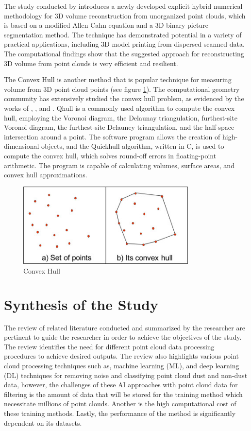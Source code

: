 The study conducted by \citet{jeong2018} introduces a newly developed explicit hybrid numerical methodology for 3D volume reconstruction from unorganized point clouds, which is based on a modified Allen-Cahn equation and a 3D binary picture segmentation method. The technique has demonstrated potential in a variety of practical applications, including 3D model printing from dispersed scanned data. The computational findings show that the suggested approach for reconstructing 3D volume from point clouds is very efficient and resilient.

The Convex Hull is another method that is popular technique for measuring volume from 3D point cloud points (see figure \ref{fig:convex hull}). The computational geometry community has extensively studied the convex hull problem, as evidenced by the works of \citet{kim2002}, \citet{graham1983}, and \citet{maus1984}. Qhull is a commonly used algorithm to compute the convex hull, employing the Voronoi diagram, the Delaunay triangulation, furthest-site Voronoi diagram, the furthest-site Delauney triangulation, and the half-space intersection around a point. The software program allows the creation of high-dimensional objects, and the Quickhull algorithm, written in C, is used to compute the convex hull, which solves round-off errors in floating-point arithmetic. The program is capable of calculating volumes, surface areas, and convex hull approximations.

\begin{figure}[H]
    \centering
    \includegraphics[width=0.8\textwidth]{Figures/convex hull.jpg}
    \caption{Convex Hull}
    \label{fig:convex hull}
\end{figure}

\section{Synthesis of the Study}

The review of related literature conducted and summarized by the researcher are pertinent to guide the researcher in order to achieve the objectives of the study. The review identifies the need for different point cloud data processing procedures to achieve desired outputs. The review also highlights various point cloud processing techniques such as, machine learning (ML), and deep learning (DL) techniques for removing noise and classifying point cloud dust and non-dust data, however, the challenges of these AI approaches with point cloud data for filtering is the amount of data that will be stored for the training method which necessitate millions of point clouds. Another is the high computational cost of these training methods. Lastly, the performance of the method is significantly dependent on its datasets. 

